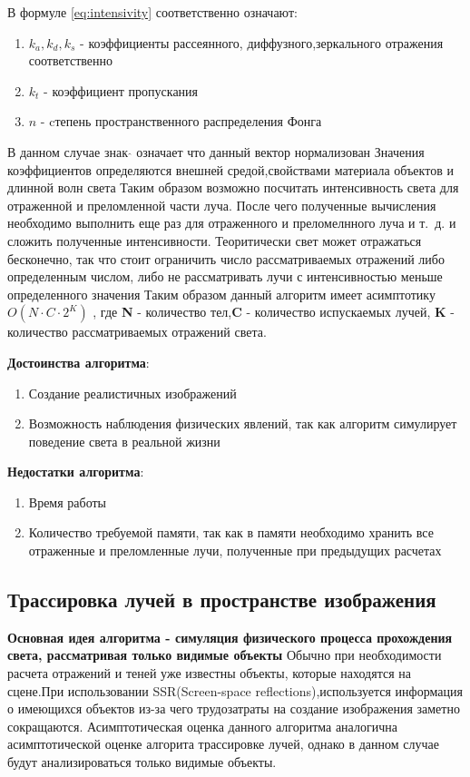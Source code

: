 \documentclass[a4paper,14pt, unknownkeysallowed]{extreport}
\begin{document}
В формуле \ref{eq:intensivity} соответственно означают:
\begin{enumerate}
	\item $k_a,k_d,k_s$ - коэффициенты рассеянного, диффузного,зеркального отражения соответственно
	\item $k_t$ - коэффициент пропускания
	\item $n$ - cтепень пространственного распределения Фонга
\end{enumerate}
В данном случае знак $ \hat{} $  означает что данный вектор нормализован
Значения коэффициентов определяются внешней средой,свойствами материала объектов и длинной волн света
Таким образом возможно посчитать интенсивность света для отраженной и преломленной части луча.
После чего полученные вычисления необходимо выполнить еще раз для отраженного и преломелнного луча и т.~д.
и сложить полученные интенсивности.
Теоритически свет может отражаться бесконечно, так что стоит ограничить число рассматриваемых отражений либо определенным числом,
либо не рассматривать лучи с интенсивностью меньше определенного значения
Таким образом данный алгоритм имеет асимптотику $O(N \cdot C \cdot 2^{K})$ , где \textbf{N} - количество тел,\textbf{C} - количество испускаемых лучей,
\textbf{K} - количество рассматриваемых отражений света. \cite{Rodgers}



\textbf{Достоинства алгоритма}:
\begin{enumerate}
	\item Создание реалистичных изображений
	\item Возможность наблюдения физических явлений, так как алгоритм симулирует поведение света в реальной жизни
\end{enumerate}


\textbf{Недостатки алгоритма}:
\begin{enumerate}
	\item Время работы
	\item Количество требуемой памяти, так как в памяти необходимо хранить все отраженные и преломленные лучи, полученные при предыдущих расчетах
\end{enumerate}


\subsection{Трассировка лучей в пространстве изображения}
\textbf{Основная идея алгоритма - симуляция физического процесса прохождения света, рассматривая только видимые объекты} \newline
Обычно при необходимости расчета отражений и теней уже известны объекты, которые находятся на сцене.При использовании SSR(Screen-space reflections),используется информация о имеющихся
объектов из-за чего трудозатраты на создание изображения заметно сокращаются.
Асимптотическая оценка данного алгоритма аналогична асимптотической оценке алгорита трассировке лучей, однако в данном случае будут анализироваться только видимые объекты.\cite{SSR}
\end{document}
